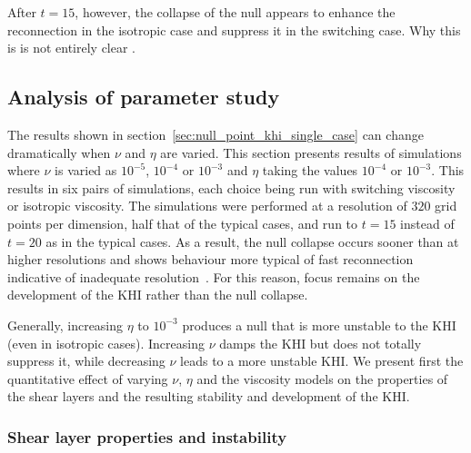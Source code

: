 After $t=15$, however, the collapse of the null appears to enhance the reconnection in the isotropic case and suppress it in the switching case. Why this is is not entirely clear .

\subsection{Analysis of parameter study}

The results shown in section~\ref{sec:null_point_khi_single_case} can change dramatically when $\nu$ and $\eta$ are varied. This section presents results of simulations where $\nu$ is varied as $10^{-5}$, $10^{-4}$ or $10^{-3}$ and $\eta$ taking the values $10^{-4}$ or $10^{-3}$. This results in six pairs of simulations, each choice being run with switching viscosity or isotropic viscosity. The simulations were performed at a resolution of $320$ grid points per dimension, half that of the typical cases, and run to $t=15$ instead of $t=20$ as in the typical cases. As a result, the null collapse occurs sooner than at higher resolutions and shows behaviour more typical of fast reconnection indicative of inadequate resolution~\cite{miyamaNumericalAstrophysicsProceedings2012}. For this reason, focus remains on the development of the KHI rather than the null collapse.

Generally, increasing $\eta$ to $10^{-3}$ produces a null that is more unstable to the KHI (even in isotropic cases). Increasing $\nu$ damps the KHI but does not totally suppress it, while decreasing $\nu$ leads to a more unstable KHI. We present first the quantitative effect of varying $\nu$, $\eta$ and the viscosity models on the properties of the shear layers and the resulting stability and development of the KHI.


\subsubsection{Shear layer properties and instability}


